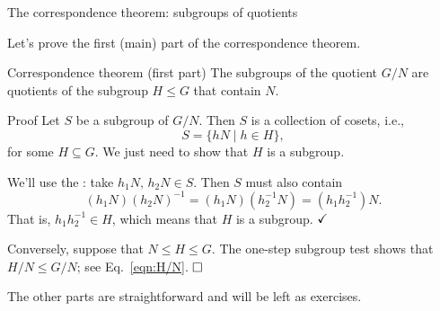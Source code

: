 \documentclass[8pt, handout]{beamer}
\newcommand{\Pause}{}      %
\begin{document}

\begin{frame}{The correspondence theorem: subgroups of quotients} %
  
  Let's prove the first (main) part of the correspondence theorem.
  
  \begin{block}{Correspondence theorem (first part)}
    The subgroups of the quotient $G/N$ are quotients of the
    subgroup $H\leq G$ that contain $N$.
  \end{block}
  
  \begin{exampleblock}{Proof}
    Let $S$ be a subgroup of $G/N$. \Pause Then $S$ is a collection of
    cosets, i.e.,
    \[
    S=\big\{hN\mid h\in H\big\},
    \]
    for some  $H\subseteq G$. \Pause We just need to
    show that $H$ is a subgroup. \medskip\pause

    We'll use the : take
    $h_1N,\,h_2N\in S$. \Pause Then $S$ must also contain
    \begin{equation}\label{eqn:H/N}
    (h_1N)(h_2N)^{-1}=(h_1N)(h_2^{-1}N)=(h_1h_2^{-1})N.
    \end{equation}
    That is, $h_1h_2^{-1}\in H$, which means that $H$ is a
    subgroup. $\hfill\checkmark$ \medskip\pause

    Conversely, suppose that $N\leq H\leq G$. \Pause The one-step subgroup
    test shows that $H/N\leq G/N$; see Eq.~\eqref{eqn:H/N}. $\hfill\Box$
  \end{exampleblock}
  
  \smallskip\Pause
  
  The other parts are straightforward and will be left as exercises.
\end{frame}

\end{document}
